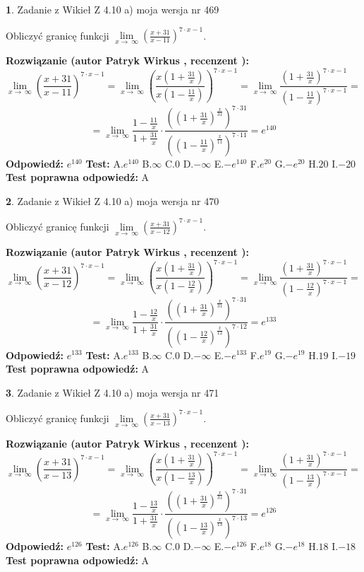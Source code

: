 \documentclass[12pt, a4paper]{article}
\theoremstyle{definition} %
\newtheorem{zad}{}
\newcommand{\zadStart}[1]{\begin{zad}#1\newline}
\newcommand{\zadStop}{\end{zad}}
\newcommand{\rozwStart}[2]{\noindent \textbf{Rozwiązanie (autor #1 , recenzent #2): }\newline}
\newcommand{\rozwStop}{\newline}
\newcommand{\odpStart}{\noindent \textbf{Odpowiedź:}\newline}
\newcommand{\odpStop}{\newline}
\newcommand{\testStart}{\noindent \textbf{Test:}\newline}
\newcommand{\testStop}{\newline}
\newcommand{\kluczStart}{\noindent \textbf{Test poprawna odpowiedź:}\newline}
\newcommand{\kluczStop}{\newline}
\begin{document}
\zadStart{Zadanie z Wikieł Z 4.10 a) moja wersja nr 469}

Obliczyć granicę funkcji  $\lim\limits_{x\to\ \infty}(\frac{x+31}{x-11})^{7\cdot x-1}$.
\zadStop
\rozwStart{Patryk Wirkus}{}
$$\lim\limits_{x\to\ \infty}(\frac{x+31}{x-11})^{7\cdot x-1} = \lim\limits_{x\to\ \infty}(\frac{x(1+\frac{31}{x})}{x(1-\frac{11}{x})})^{7\cdot x-1}=\lim\limits_{x\to\ \infty}\frac{(1+\frac{31}{x})^{7\cdot x-1}}{(1-\frac{11}{x})^{7\cdot x-1}}=$$
$$=\lim\limits_{x\to\ \infty}\frac{1-\frac{11}{x}}{1+\frac{31}{x}}\cdot\frac{((1+\frac{31}{x})^{\frac{x}{31}})^{7\cdot31}}{((1-\frac{11}{x})^{\frac{x}{11}})^{7\cdot11}}=e^{140}$$
\rozwStop
\odpStart
$e^{140}$
\odpStop
\testStart
A.$e^{140}$ B.$\infty$ C.$0$ D.$-\infty$ E.$-e^{140}$
F.$e^{20}$ G.$-e^{20}$
H.$20$
I.$-20$
\testStop
\kluczStart
A
\kluczStop



\zadStart{Zadanie z Wikieł Z 4.10 a) moja wersja nr 470}

Obliczyć granicę funkcji  $\lim\limits_{x\to\ \infty}(\frac{x+31}{x-12})^{7\cdot x-1}$.
\zadStop
\rozwStart{Patryk Wirkus}{}
$$\lim\limits_{x\to\ \infty}(\frac{x+31}{x-12})^{7\cdot x-1} = \lim\limits_{x\to\ \infty}(\frac{x(1+\frac{31}{x})}{x(1-\frac{12}{x})})^{7\cdot x-1}=\lim\limits_{x\to\ \infty}\frac{(1+\frac{31}{x})^{7\cdot x-1}}{(1-\frac{12}{x})^{7\cdot x-1}}=$$
$$=\lim\limits_{x\to\ \infty}\frac{1-\frac{12}{x}}{1+\frac{31}{x}}\cdot\frac{((1+\frac{31}{x})^{\frac{x}{31}})^{7\cdot31}}{((1-\frac{12}{x})^{\frac{x}{12}})^{7\cdot12}}=e^{133}$$
\rozwStop
\odpStart
$e^{133}$
\odpStop
\testStart
A.$e^{133}$ B.$\infty$ C.$0$ D.$-\infty$ E.$-e^{133}$
F.$e^{19}$ G.$-e^{19}$
H.$19$
I.$-19$
\testStop
\kluczStart
A
\kluczStop



\zadStart{Zadanie z Wikieł Z 4.10 a) moja wersja nr 471}

Obliczyć granicę funkcji  $\lim\limits_{x\to\ \infty}(\frac{x+31}{x-13})^{7\cdot x-1}$.
\zadStop
\rozwStart{Patryk Wirkus}{}
$$\lim\limits_{x\to\ \infty}(\frac{x+31}{x-13})^{7\cdot x-1} = \lim\limits_{x\to\ \infty}(\frac{x(1+\frac{31}{x})}{x(1-\frac{13}{x})})^{7\cdot x-1}=\lim\limits_{x\to\ \infty}\frac{(1+\frac{31}{x})^{7\cdot x-1}}{(1-\frac{13}{x})^{7\cdot x-1}}=$$
$$=\lim\limits_{x\to\ \infty}\frac{1-\frac{13}{x}}{1+\frac{31}{x}}\cdot\frac{((1+\frac{31}{x})^{\frac{x}{31}})^{7\cdot31}}{((1-\frac{13}{x})^{\frac{x}{13}})^{7\cdot13}}=e^{126}$$
\rozwStop
\odpStart
$e^{126}$
\odpStop
\testStart
A.$e^{126}$ B.$\infty$ C.$0$ D.$-\infty$ E.$-e^{126}$
F.$e^{18}$ G.$-e^{18}$
H.$18$
I.$-18$
\testStop
\kluczStart
A
\kluczStop
\end{document}
